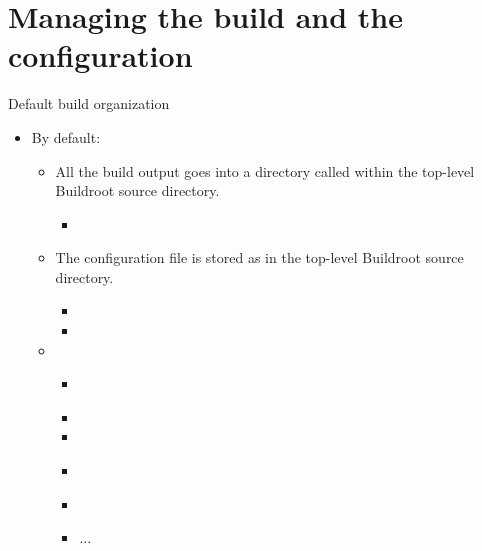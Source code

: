
\section{Managing the build and the configuration}

\begin{frame}{Default build organization}
  \begin{itemize}
  \item By default:
    \begin{itemize}
    \item All the build output goes into a directory called
       within the top-level Buildroot source directory.
      \begin{itemize}
      \item {}
      \end{itemize}
    \item The configuration file is stored as  in the
      top-level Buildroot source directory.
      \begin{itemize}
      \item {}
      \item {}
      \end{itemize}
    \item {}
      \begin{itemize}
      \item {\bf {}}
      \item {}
      \item {}
      \item {\bf {}}
      \item {}
      \item ...
      \end{itemize}
    \end{itemize}
  \end{itemize}
\end{frame}

